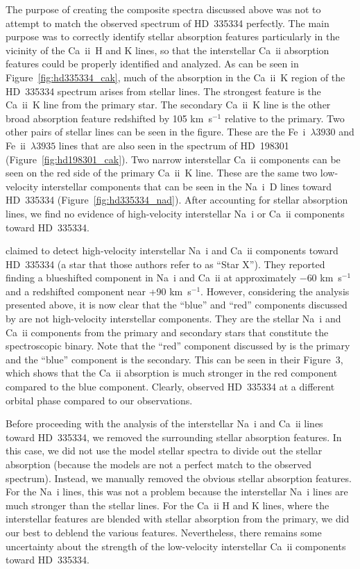 \documentclass[fleqn,usenatbib]{mnras}
\begin{document}
The purpose of creating the composite spectra discussed above was not to attempt to match the observed spectrum of HD~335334 perfectly. The main purpose was to correctly identify stellar absorption features particularly in the vicinity of the Ca~{\sc ii}~H and K lines, so that the interstellar Ca~{\sc ii} absorption features could be properly identified and analyzed. As can be seen in Figure~\ref{fig:hd335334_cak}, much of the absorption in the Ca~{\sc ii}~K region of the HD~335334 spectrum arises from stellar lines. The strongest feature is the Ca~{\sc ii}~K line from the primary star. The secondary Ca~{\sc ii}~K line is the other broad absorption feature redshifted by 105 km~s$^{-1}$ relative to the primary. Two other pairs of stellar lines can be seen in the figure. These are the Fe~{\sc i}~$\lambda3930$ and Fe~{\sc ii}~$\lambda3935$ lines that are also seen in the spectrum of HD~198301 (Figure~\ref{fig:hd198301_cak}). Two narrow interstellar Ca~{\sc ii} components can be seen on the red side of the primary Ca~{\sc ii}~K line. These are the same two low-velocity interstellar components that can be seen in the Na~{\sc i}~D lines toward HD~335334 (Figure~\ref{fig:hd335334_nad}). After accounting for stellar absorption lines, we find no evidence of high-velocity interstellar Na~{\sc i} or Ca~{\sc ii} components toward HD~335334.

\citet{f18b} claimed to detect high-velocity interstellar Na~{\sc i} and Ca~{\sc ii} components toward HD~335334 (a star that those authors refer to as ``Star X''). They reported finding a blueshifted component in Na~{\sc i} and Ca~{\sc ii} at approximately $-$60 km~s$^{-1}$ and a redshifted component near +90 km~s$^{-1}$. However, considering the analysis presented above, it is now clear that the ``blue'' and ``red'' components discussed by \citet{f18b} are not high-velocity interstellar components. They are the stellar Na~{\sc i} and Ca~{\sc ii} components from the primary and secondary stars that constitute the spectroscopic binary. Note that the ``red'' component discussed by \citet{f18b} is the primary and the ``blue'' component is the secondary. This can be seen in their Figure~3, which shows that the Ca~{\sc ii} absorption is much stronger in the red component compared to the blue component. Clearly, \citet{f18b} observed HD~335334 at a different orbital phase compared to our observations.

Before proceeding with the analysis of the interstellar Na~{\sc i} and Ca~{\sc ii} lines toward HD~335334, we removed the surrounding stellar absorption features. In this case, we did not use the model stellar spectra to divide out the stellar absorption (because the models are not a perfect match to the observed spectrum). Instead, we manually removed the obvious stellar absorption features. For the Na~{\sc i} lines, this was not a problem because the interstellar Na~{\sc i} lines are much stronger than the stellar lines. For the Ca~{\sc ii} H and K lines, where the interstellar features are blended with stellar absorption from the primary, we did our best to deblend the various features. Nevertheless, there remains some uncertainty about the strength of the low-velocity interstellar Ca~{\sc ii} components toward HD~335334.
\end{document}
